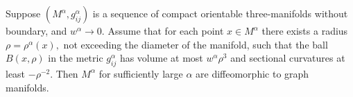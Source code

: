 \begin{theorem}
  \label{thm:cz-shioya-yamaguchi-closed-collapsing-graph-manifolds}
Suppose
$(M^{\alpha},g^{\alpha}_{ij})$ is a sequence of compact orientable
three-manifolds without boundary, and $w^{\alpha}\rightarrow 0$.
Assume that for each point $x \in M^{\alpha}$ there exists a
radius $\rho = \rho^{\alpha}(x),$ not exceeding the diameter of
the manifold, such that the ball $B(x,\rho)$ in the metric
$g^{\alpha}_{ij}$ has volume at most $w^{\alpha}\rho^3$ and
sectional curvatures at least $-\rho^{-2}$. Then $M^{\alpha}$ for
sufficiently large $\alpha$ are diffeomorphic to graph manifolds.
\end{theorem}
